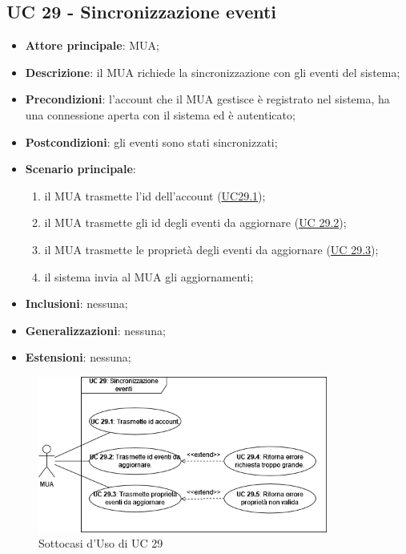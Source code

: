 
\subsection{UC 29 - Sincronizzazione eventi} \label{sec:UC29}
    
    \begin{itemize}
        \item \textbf{Attore principale}: MUA;
        \item \textbf{Descrizione}: il MUA richiede la sincronizzazione con gli eventi del sistema;
        \item \textbf{Precondizioni}: l’account che il MUA gestisce è registrato nel sistema, ha una connessione aperta con il sistema ed è autenticato;
        \item \textbf{Postcondizioni}: gli eventi sono stati sincronizzati;
        \item \textbf{Scenario principale}:
            \begin{enumerate}
                \item il MUA trasmette l'id dell'account (\hyperref[sec:UC29.1]{UC29.1});
                \item il MUA trasmette gli id degli eventi da aggiornare (\hyperref[sec:UC29.2]{UC 29.2});
                \item il MUA trasmette le proprietà degli eventi da aggiornare (\hyperref[sec:UC29.3]{UC 29.3});
                \item il sistema invia al MUA gli aggiornamenti;
            \end{enumerate}
        \item \textbf{Inclusioni}: nessuna;
        \item \textbf{Generalizzazioni}: nessuna;
        \item \textbf{Estensioni}: nessuna;
    \end{itemize}

    \begin{figure}[H]
        \includegraphics[width=0.85\textwidth]{sections/uc_imgs/UC29.png}
        \centering
        \caption{Sottocasi d'Uso di UC 29}
    \end{figure}

